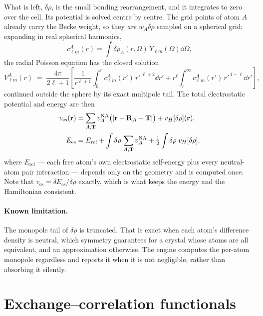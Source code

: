 \documentclass[11pt,a4paper]{article}
\begin{document}
What is left, $\delta\rho$, is the small bonding rearrangement, and it
integrates to zero over the cell. Its potential is solved centre by centre.
The grid points of atom $A$ already carry the Becke weight, so they \emph{are}
$w_A \delta\rho$ sampled on a spherical grid; expanding in real spherical
harmonics,
\begin{equation}
  c_{\ell m}^A(r) = \int \delta\rho_A(r,\Omega)\, Y_{\ell m}(\Omega)\dd\Omega ,
\end{equation}
the radial Poisson equation has the closed solution
\begin{equation}
  V_{\ell m}^A(r) \;=\; \frac{4\pi}{2\ell+1}
    \left[ \frac{1}{r^{\ell+1}}\int_0^r c_{\ell m}^A(r')\, r'^{\,\ell+2}\dd r'
         + r^{\ell}\int_r^{\infty} c_{\ell m}^A(r')\, r'^{\,1-\ell}\dd r'
    \right],
  \label{eq:poisson}
\end{equation}
continued outside the sphere by its exact multipole tail. The total
electrostatic potential and energy are then
\begin{align}
  v_{\text{es}}(\vb{r}) &= \sum_{A,\vb{T}} v_A^{\text{NA}}
        \bigl(\abs{\vb{r}-\vb{R}_A-\vb{T}}\bigr) + v_H[\delta\rho](\vb{r}),\\
  E_{\text{es}} &= E_{\text{ref}}
        + \int \delta\rho\, \sum_{A,\vb{T}} v_A^{\text{NA}}
        + \tfrac12 \int \delta\rho\; v_H[\delta\rho] ,
\end{align}
where $E_{\text{ref}}$ --- each free atom's own electrostatic self-energy plus
every neutral-atom pair interaction --- depends only on the geometry and is
computed once. Note that $v_{\text{es}} = \delta E_{\text{es}}/\delta\rho$
exactly, which is what keeps the energy and the Hamiltonian consistent.

\paragraph{Known limitation.} The monopole tail of $\delta\rho$ is truncated.
That is exact when each atom's difference density is neutral, which symmetry
guarantees for a crystal whose atoms are all equivalent, and an approximation
otherwise. The engine computes the per-atom monopole regardless and reports it
when it is not negligible, rather than absorbing it silently.

\section{Exchange--correlation functionals}
\label{sec:xc}
\end{document}
